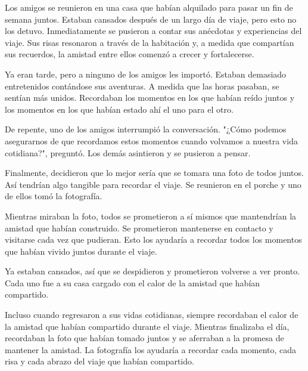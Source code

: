 

Los amigos se reunieron en una casa que habían alquilado para pasar un fin de semana juntos. Estaban cansados después de un largo día de viaje, pero esto no los detuvo. Inmediatamente se pusieron a contar sus anécdotas y experiencias del viaje. Sus risas resonaron a través de la habitación y, a medida que compartían sus recuerdos, la amistad entre ellos comenzó a crecer y fortalecerse.

Ya eran tarde, pero a ninguno de los amigos les importó. Estaban demasiado entretenidos contándose sus aventuras. A medida que las horas pasaban, se sentían más unidos. Recordaban los momentos en los que habían reído juntos y los momentos en los que habían estado ahí el uno para el otro.

De repente, uno de los amigos interrumpió la conversación. "¿Cómo podemos asegurarnos de que recordamos estos momentos cuando volvamos a nuestra vida cotidiana?", preguntó. Los demás asintieron y se pusieron a pensar.

Finalmente, decidieron que lo mejor sería que se tomara una foto de todos juntos. Así tendrían algo tangible para recordar el viaje. Se reunieron en el porche y uno de ellos tomó la fotografía.

Mientras miraban la foto, todos se prometieron a sí mismos que mantendrían la amistad que habían construido. Se prometieron mantenerse en contacto y visitarse cada vez que pudieran. Esto los ayudaría a recordar todos los momentos que habían vivido juntos durante el viaje.

Ya estaban cansados, así que se despidieron y prometieron volverse a ver pronto. Cada uno fue a su casa cargado con el calor de la amistad que habían compartido.

Incluso cuando regresaron a sus vidas cotidianas, siempre recordaban el calor de la amistad que habían compartido durante el viaje. Mientras finalizaba el día, recordaban la foto que habían tomado juntos y se aferraban a la promesa de mantener la amistad. La fotografía los ayudaría a recordar cada momento, cada risa y cada abrazo del viaje que habían compartido.